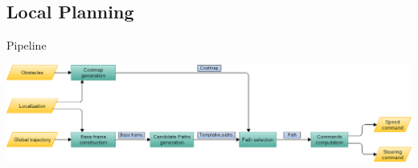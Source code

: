 \graphicspath{
  {./images/bmps/}{./images/vects/}{./images/}
  {./images/presentation/bmps/}{./images/presentation/vects/}{./images/presentation/}
  {./images/chapter00/bmps/}{./images/chapter00/vects/}{./images/chapter00/}
  {./images/chapter07/bmps/}{./images/chapter07/vects/}{./images/chapter07/}
}

\subsection{Local Planning}

\begin{frame}{Pipeline}
   \begin{center}
    \includegraphics[width=\textwidth]{pipeline_cp07}
  \end{center}
  
  \note {

  }
\end{frame}

